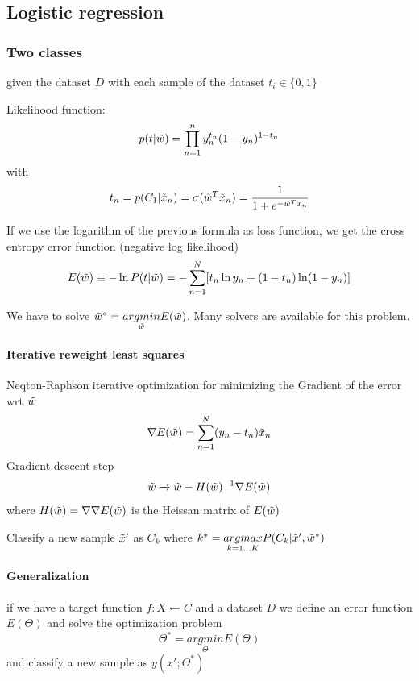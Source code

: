 \subsection{Logistic regression}
\subsubsection{Two classes}
given the dataset $D$ with each sample of the dataset $t_{i} \in \{0, 1\}$

Likelihood function:
\begin{equation}
    p(t|\Tilde{w}) = \prod_{n=1}^{n} y^{t_{n}}_{n}(1 - y_{n})^{1 - t_{n}}
\end{equation}
with 
\[t_{n} = p(C_{1}|\Tilde{x}_{n}) = \sigma(\Tilde{w}^{T}\Tilde{x}_{n}) = \frac{1}{1 + e^{-\Tilde{w}^{T}\Tilde{x}_{n}}}\]

If we use the logarithm of the previous formula as loss function, we get the cross entropy error function (negative log likelihood)
\begin{equation}
    E(\Tilde{w}) \equiv -\ln P(t|\Tilde{w}) = -\sum^{N}_{n=1} [t_{n}\ln y_{n} + (1 - t_{n}) \ln (1 - y_{n})]
\end{equation}

We have to solve $\Tilde{w}^{*} = \underset{\Tilde{w}}{argmin}E(\Tilde{w})$. Many solvers are available for this problem.

\paragraph{Iterative reweight least squares}
Neqton-Raphson iterative optimization for minimizing the Gradient of the error wrt $\Tilde{w}$
\begin{equation}
    \nabla E(\Tilde{w}) = \sum_{n=1}^{N}(y_{n} - t_{n})\Tilde{x}_{n}
\end{equation}
Gradient descent step
\begin{equation}
    \Tilde{w} \xrightarrow[]{} \Tilde{w} - H(\Tilde{w})^{-1}\nabla E(\Tilde{w})
\end{equation}
where $H(\Tilde{w}) = \nabla \nabla E(\Tilde{w})$ is the Heissan matrix of $E(\Tilde{w})$

Classify a new sample $\Tilde{x}'$ as $C_{k}$ where $k^{*} = \underset{k=1\dots K}{argmax} P(C_{k}|\Tilde{x}', \Tilde{w}^{*})$

\paragraph{Generalization}
if we have a target function $f: X \xleftarrow{}C$ and a dataset $D$ we define an error function $E(\Theta)$ and solve the optimization problem
\begin{equation}
    \Theta^{*} = \underset{\Theta}{argmin} E(\Theta)
\end{equation}
and classify a new sample as $y(x'; \Theta^{*})$

